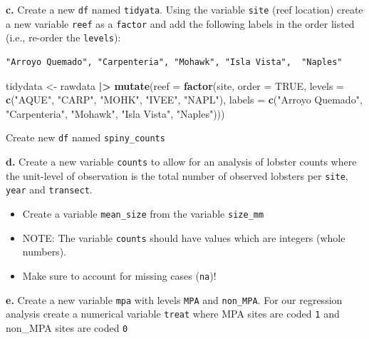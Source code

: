 \documentclass[
]{article}
\newenvironment{Shaded}{\begin{snugshade}}{\end{snugshade}}
\newcommand{\AttributeTok}[1]{\textcolor[rgb]{0.13,0.29,0.53}{#1}}
\newcommand{\ConstantTok}[1]{\textcolor[rgb]{0.56,0.35,0.01}{#1}}
\newcommand{\FunctionTok}[1]{\textcolor[rgb]{0.13,0.29,0.53}{\textbf{#1}}}
\newcommand{\NormalTok}[1]{#1}
\newcommand{\OtherTok}[1]{\textcolor[rgb]{0.56,0.35,0.01}{#1}}
\newcommand{\SpecialCharTok}[1]{\textcolor[rgb]{0.81,0.36,0.00}{\textbf{#1}}}
\newcommand{\StringTok}[1]{\textcolor[rgb]{0.31,0.60,0.02}{#1}}
\providecommand{\tightlist}{%
  \setlength{\itemsep}{0pt}\setlength{\parskip}{0pt}}
\begin{document}
\textbf{c.} Create a new \texttt{df} named \texttt{tidyata}. Using the
variable \texttt{site} (reef location) create a new variable
\texttt{reef} as a \texttt{factor} and add the following labels in the
order listed (i.e., re-order the \texttt{levels}):

\begin{verbatim}
"Arroyo Quemado", "Carpenteria", "Mohawk", "Isla Vista",  "Naples"
\end{verbatim}

\begin{Shaded}
\begin{Highlighting}[]
\NormalTok{ tidydata }\OtherTok{\textless{}{-}}\NormalTok{ rawdata }\SpecialCharTok{|\textgreater{}}    
    \FunctionTok{mutate}\NormalTok{(}\AttributeTok{reef =} \FunctionTok{factor}\NormalTok{(site, }\AttributeTok{order =} \ConstantTok{TRUE}\NormalTok{, }\AttributeTok{levels =} \FunctionTok{c}\NormalTok{(}\StringTok{"AQUE"}\NormalTok{, }\StringTok{"CARP"}\NormalTok{, }\StringTok{"MOHK"}\NormalTok{, }\StringTok{"IVEE"}\NormalTok{, }\StringTok{"NAPL"}\NormalTok{), }\AttributeTok{labels =} \FunctionTok{c}\NormalTok{(}\StringTok{"Arroyo Quemado"}\NormalTok{, }\StringTok{"Carpenteria"}\NormalTok{, }\StringTok{"Mohawk"}\NormalTok{, }\StringTok{"Isla Vista"}\NormalTok{,  }\StringTok{"Naples"}\NormalTok{))) }
\end{Highlighting}
\end{Shaded}

Create new \texttt{df} named \texttt{spiny\_counts}

\textbf{d.} Create a new variable \texttt{counts} to allow for an
analysis of lobster counts where the unit-level of observation is the
total number of observed lobsters per \texttt{site}, \texttt{year} and
\texttt{transect}.

\begin{itemize}
\tightlist
\item
  Create a variable \texttt{mean\_size} from the variable
  \texttt{size\_mm}
\item
  NOTE: The variable \texttt{counts} should have values which are
  integers (whole numbers).
\item
  Make sure to account for missing cases (\texttt{na})!
\end{itemize}

\textbf{e.} Create a new variable \texttt{mpa} with levels \texttt{MPA}
and \texttt{non\_MPA}. For our regression analysis create a numerical
variable \texttt{treat} where MPA sites are coded \texttt{1} and
non\_MPA sites are coded \texttt{0}
\end{document}
